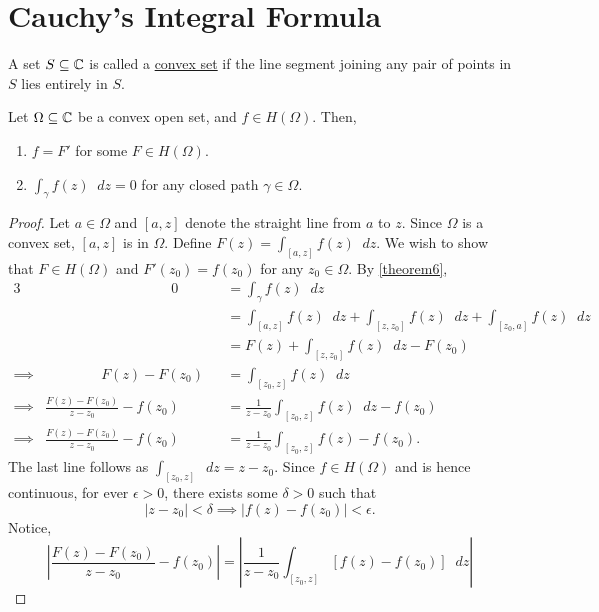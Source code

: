 \documentclass[11pt]{article}
\newcommand*\dif{\mathop{}\!d}
\begin{document}
\section{Cauchy's Integral Formula}
\begin{definition}
    A set $S \subseteq \mathbb{C}$ is called a \underline{convex set} if the line
	segment joining any pair of points in $S$ lies entirely in $S$.
\end{definition}
\begin{theorem} \label{theorem14}
	Let $\Omega\subseteq\mathbb{C}$ be a convex open set, and $f \in H(\Omega)$. Then,
	\begin{enumerate}
		\item $f = F'$ for some $F\in H(\Omega)$.
		\item $\int_\gamma f(z) \dif z = 0$  for any closed path $\gamma \in
			\Omega$.
\end{enumerate}
\begin{proof}
	Let $a \in \Omega$ and $[a,z]$ denote the straight line from $a$ to $z$.
	Since $\Omega$ is a convex set, $[a,z]$ is in $\Omega$. Define $F(z) =
	\int_{[a,z]} f(z)\dif z$. We wish to show that $F \in H(\Omega)$ and
	$F'(z_0) = f(z_0)$ for any $z_0 \in \Omega$. By \cref{theorem6},
	\begin{alignat*}{3}
		&\qquad\qquad\qquad\qquad\quad 0 &&= \int_{\gamma} f(z) \dif z \\
		&&& = \int_{[a,z]} f(z) \dif z+\int_{[z,z_0]} f(z) \dif z +
		\int_{[z_0,a]} f(z) \dif z\\
		&&& = F(z)+\int_{[z,z_0]} f(z) \dif z-F(z_0)\\
		\implies &\qquad\qquad F(z)-F(z_0) &&= \int_{[z_0,z]}f(z) \dif z\\
		\implies & \frac{F(z) -F(z_0)}{z-z_0}-f(z_0) &&=\frac{1}{z-z_0}
		\int_{[z_0,z]} f(z) \dif z-f(z_0)\\ 
		\implies & \frac{F(z) -F(z_0)}{z-z_0}-f(z_0) &&=\frac{1}{z-z_0}
		\int_{[z_0,z]} f(z)-f(z_0).
	\end{alignat*}
	The last line follows as $ \int_{[z_0,z]}\dif z = z-z_0$. Since $f\in
	H(\Omega)$ and is hence continuous, for ever $\epsilon>0$, there exists some
$\delta > 0$ such that
\begin{equation*}
	|z-z_0| < \delta \implies |f(z)-f(z_0)| < \epsilon.
\end{equation*}
Notice,
\begin{equation*}
\left|\frac{F(z)-F(z_0)}{z-z_0}-f(z_0)\right|
= \left|\frac{1}{z-z_0} \int_{[z_0, z]} \left[f(z)-f(z_0)\right] \dif{z}\right|

\end{equation*}
\end{proof}
\end{theorem}
\end{document}
